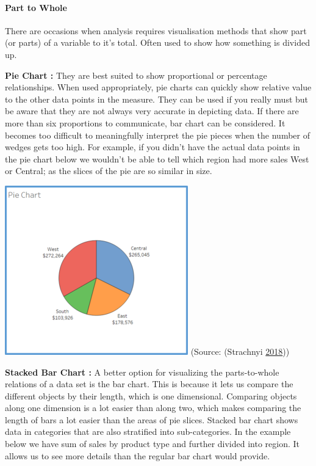 \documentclass[]{book}
\let\oldparagraph\paragraph
\renewcommand{\paragraph}[1]{\oldparagraph{#1}\mbox{}}
\begin{document}
\hypertarget{part-to-whole}{%
\paragraph{Part to Whole}\label{part-to-whole}}

There are occasions when analysis requires visualisation methods that show part (or parts) of a variable to it's total. Often used to show how something is divided up.

\textbf{Pie Chart :} They are best suited to show proportional or percentage relationships. When used appropriately, pie charts can quickly show relative value to the other data points in the measure.
They can be used if you really must but be aware that they are not always very accurate in depicting data. If there are more than six proportions to communicate, bar chart can be considered. It becomes too difficult to meaningfully interpret the pie pieces when the number of wedges gets too high. For example, if you didn't have the actual data points in the pie chart below we wouldn't be able to tell which region had more sales West or Central; as the slices of the pie are so similar in size.

\includegraphics{images/3.2.2_Pie_chart.png}
(Source: (Strachnyi \protect\hyperlink{ref-Charts_CheatSheet}{2018}))

\textbf{Stacked Bar Chart :} A better option for visualizing the parts-to-whole relations of a data set is the bar chart. This is because it lets us compare the different objects by their length, which is one dimensional. Comparing objects along one dimension is a lot easier than along two, which makes comparing the length of bars a lot easier than the areas of pie slices. Stacked bar chart shows data in categories that are also stratified into sub-categories. In the example below we have sum of sales by product type and further divided into region. It allows us to see more details than the regular bar chart would provide.
\end{document}
